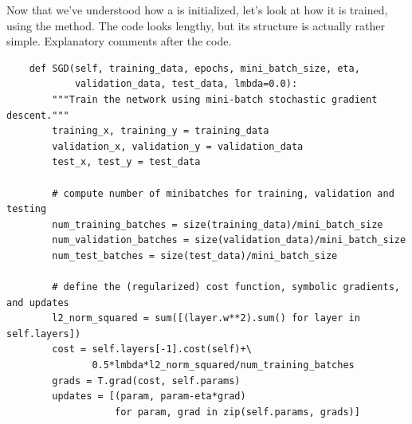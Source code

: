 \documentclass[a4paper,twoside,10pt]{book}
\begin{document}
Now that we've understood how a  is initialized, let's look at how it is trained, using the  method. The code looks lengthy, but its structure is actually rather simple. Explanatory comments after the code.
\begin{lstlisting}
    def SGD(self, training_data, epochs, mini_batch_size, eta, 
            validation_data, test_data, lmbda=0.0):
        """Train the network using mini-batch stochastic gradient descent."""
        training_x, training_y = training_data
        validation_x, validation_y = validation_data
        test_x, test_y = test_data

        # compute number of minibatches for training, validation and testing
        num_training_batches = size(training_data)/mini_batch_size
        num_validation_batches = size(validation_data)/mini_batch_size
        num_test_batches = size(test_data)/mini_batch_size

        # define the (regularized) cost function, symbolic gradients, and updates
        l2_norm_squared = sum([(layer.w**2).sum() for layer in self.layers])
        cost = self.layers[-1].cost(self)+\
               0.5*lmbda*l2_norm_squared/num_training_batches
        grads = T.grad(cost, self.params)
        updates = [(param, param-eta*grad) 
                   for param, grad in zip(self.params, grads)]


\end{lstlisting}
\end{document}
